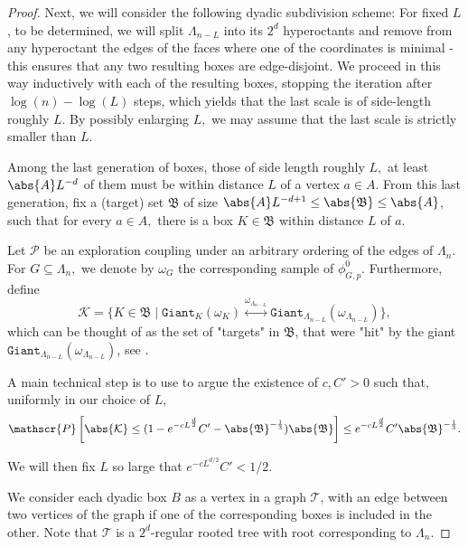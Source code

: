 \documentclass[article,11pt,reqno]{amsart}
\newcommand{\Giant}{\mathtt{Giant}}
\begin{document}
\begin{appendix}
\begin{proof}
Next, we will consider the following dyadic subdivision scheme: For fixed $L$, to be determined, we will split $\Lambda_{n-L}$ into its $2^d$ hyperoctants and remove from any hyperoctant the edges of the faces where one of the coordinates is minimal - this ensures that any two resulting boxes are edge-disjoint. We proceed in this way inductively with each of the resulting boxes, stopping the iteration after $\log(n)-\log(L)$ steps, which yields that the last scale is of side-length roughly $L$. By possibly enlarging $L,$ we may assume that the last scale is strictly smaller than $L$.


Among the last generation of boxes, those of side length roughly $L,$ at least $\abs{A}L^{-d}$ of them must be within distance $L$ of a vertex $a \in A$.  From this last generation, fix a (target) set $\mathfrak{B}$ of size $\abs{A}L^{-d+1}\leq \abs{\mathfrak{B}} \leq \abs{A}$, such that for every $a\in A,$ there is a box $K\in \mathfrak{B}$ within distance $L$ of $a$.

 Let $\mathscr{P}$ be an exploration coupling under an arbitrary ordering of the edges of $\Lambda_n.$ For $G\subseteq \Lambda_n,$ we denote by $\omega_G$ the corresponding sample of $\phi^0_{G,p}$. Furthermore, define 
 $$
\mathcal{K}= \{K \in \mathfrak{B}\mid \Giant_K(\omega_K) \overset{\omega_{\Lambda_{n-L}}}{\longleftrightarrow } \Giant_{\Lambda_{n-L}}(\omega_{\Lambda_{n-L}})\},
 $$
 which can be thought of as the set of "targets" in  $\mathfrak{B}$, that were "hit" by the giant $\Giant_{\Lambda_{n-L}}(\omega_{\Lambda_{n-L}})$, see . 
  
 A main technical step  is to use  to argue the existence of $c,C'>0$ such that, uniformly in our choice of $L,$
 \begin{align} \label{eq:tree_lemma_output}
 \mathscr{P}\left[\abs{\mathcal{K}}\leq (1- e^{-cL^\frac{d}{2}} C' - \abs{\mathfrak{B}}^{-\frac{1}{3}})\abs{\mathfrak{B}}\right] \leq  e^{-cL^\frac{d}{2}} C'\abs{\mathfrak{B}}^{-\frac{1}{3}}. 
 \end{align}

We will then fix $L$ so large that $e^{-cL^{d/2}}C'<1/2.$

We consider each dyadic box $B$ as a vertex in a graph $\mathscr{T}$, with an edge between two vertices of the graph if one of the corresponding boxes is included in the other. Note that $\mathscr{T}$ is a $2^d$-regular rooted tree with root corresponding to $\Lambda_n$. 



\end{proof}
\end{appendix}
\end{document}

